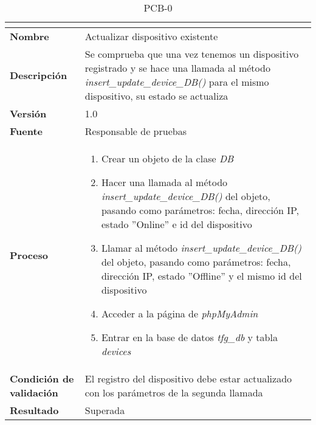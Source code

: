 \begin{table}[H]
	\caption{PCB-0\number\pcb}
	\begin{tabular}{|l|p{}|}
		\hline
		\multicolumn{2}{|c|}{\cellcolor[HTML]{BFBFBF}{\color[HTML]{000000} \textbf{PCB-0\number\pcb}}} \\ \hline
		\textbf{Nombre}                  & Actualizar dispositivo existente                                                                                                                                              \\ \hline
		\textbf{Descripción}             & Se comprueba que una vez tenemos un dispositivo registrado y se hace una llamada al método \textit{insert\_update\_device\_DB()} para el mismo dispositivo, su estado se actualiza \\ \hline
		\textbf{Versión}                 & 1.0                                                                                                                                                                           \\ \hline
		\textbf{Fuente}                  & Responsable de pruebas                                                                                                                                                        \\ \hline
		\textbf{Proceso}                 & \begin{enumerate}
			\item Crear un objeto de la clase \textit{DB}
			\item Hacer una llamada al método \textit{insert\_update\_device\_DB()} del objeto, pasando como parámetros: fecha, dirección IP, estado ''Online'' e id del dispositivo
			\item Llamar al método \textit{insert\_update\_device\_DB()} del objeto, pasando como parámetros: fecha, dirección IP, estado ''Offline'' y el mismo id del dispositivo
			\item Acceder a la página de \textit{phpMyAdmin}
			\item Entrar en la base de datos \textit{tfg\_db} y tabla \textit{devices}
		\end{enumerate}                                                                                                                                                     \\ \hline
		\textbf{Condición de validación} & El registro del dispositivo debe estar actualizado con los parámetros de la segunda llamada                                                                                   \\ \hline
		\textbf{Resultado}               & Superada                                                                                                                                                                      \\ \hline
	\end{tabular}
\end{table}
